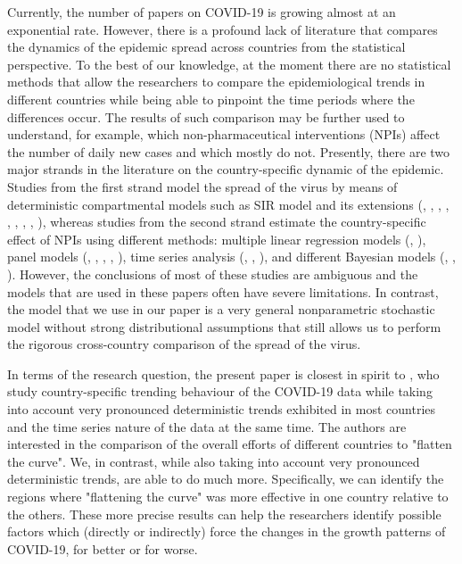 \documentclass[a4paper,12pt]{article}
\numberwithin{equation}{section}
\begin{document}
Currently, the number of papers on COVID-19 is growing almost at an exponential rate. However, there is a profound lack of literature that compares the dynamics of the epidemic spread across countries from the statistical perspective. To the best of our knowledge, at the moment there are no statistical methods that allow the researchers to compare the epidemiological trends in different countries while being able to pinpoint the time periods where the differences occur. The results of such comparison may be further used to understand, for example, which non-pharmaceutical interventions (NPIs) affect the number of daily new cases and which mostly do not. Presently, there are two major strands in the literature on the country-specific dynamic of the epidemic. Studies from the first strand model the spread of the virus by means of deterministic compartmental models such as SIR model and its extensions (\cite{Atkeson2020}, \cite{Anastassopoulou2020}, \cite{Buckman2020}, \cite{Fang2020}, \cite{Gu2020}, \cite{Lin2020},  \cite{Liu2020}, \cite{Wu2020}, \cite{Yang2020}), whereas studies from the second strand estimate the country-specific effect of NPIs using different methods: multiple linear regression models (\cite{Kazemi2020}, \cite{Hsiang2020}), panel models (\cite{Alfano2020}, \cite{Bjornskov2020}, \cite{DebFurceri2020}, \cite{Jamison2020},  \cite{Jinjarak2020}), time series analysis (\cite{LiLinton2020}, \cite{DongLinton2020}, \cite{Deb2020}), and different Bayesian models (\cite{Banholzer2020}, \cite{Flaxman2020}, \cite{Ferguson2020}). However, the conclusions of most of these studies are ambiguous and the models that are used in these papers often have severe limitations. In contrast, the model that we use in our paper is a very general nonparametric stochastic model without strong distributional assumptions that still allows us to perform the rigorous cross-country comparison of the spread of the virus.

In terms of the research question, the present paper is closest in spirit to \cite*{DongLinton2020}, who study country-specific trending behaviour of the COVID-19 data while taking into account very pronounced deterministic trends exhibited in most countries and the time series nature of the data at the same time. The authors are interested in the comparison of the overall efforts of different countries to "flatten the curve". We, in contrast, while also taking into account very pronounced deterministic trends, are able to do much more. Specifically, we can identify the regions where "flattening the curve" was more effective in one country relative to the others. These more precise results can help the researchers identify possible factors which (directly or indirectly) force the changes in the growth patterns of COVID-19, for better or for worse.
\end{document}
